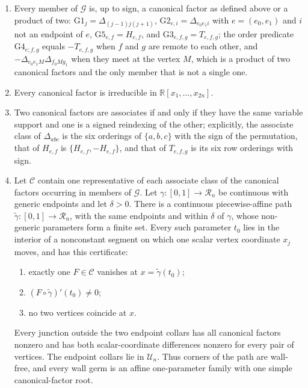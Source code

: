 \begin{lemma}
\begin{enumerate}
\item[(A1)] Every member of $\mathcal G$ is, up to sign, a canonical factor
as defined above or a product of two: $\mathrm{G1}_j=\Delta_{(j-1)j(j+1)}$,
$\mathrm{G2}_{e,i}=\Delta_{e_0e_1i}$ with $e=(e_0,e_1)$ and $i$ not an endpoint
of $e$, $\mathrm{G5}_{e,f}=H_{e,f}$, and $\mathrm{G3}_{e,f,g}=T_{e,f,g}$; the
order predicate $\mathrm{G4}_{e;f,g}$ equals $-T_{e,f,g}$ when $f$ and $g$ are
remote to each other, and $-\Delta_{e_0e_1M}\Delta_{f_0Mg_1}$ when they meet at
the vertex $M$, which is a product of two canonical factors and the only
member that is not a single one.
\item[(A2)] Every canonical factor is irreducible in $\mathbb R[x_1,\dots,x_{2n}]$.
\item[(A3)] Two canonical factors are associates if and only if they have the same
variable support and one is a signed reindexing of the other; explicitly, the
associate class of $\Delta_{abc}$ is the six orderings of $\{a,b,c\}$ with the
sign of the permutation, that of $H_{e,f}$ is $\{H_{e,f},-H_{e,f}\}$, and that
of $T_{e,f,g}$ is its six row orderings with sign.
\item[(B)] Let $\mathcal C$ contain one representative of each associate class of the
canonical factors occurring in members of $\mathcal G$. Let
$\gamma\colon[0,1]\to\mathcal R_n$ be continuous with generic endpoints and
let $\delta>0$. There is a continuous piecewise-affine path
$\tilde\gamma\colon[0,1]\to\mathcal R_n$, with the same endpoints and within
$\delta$ of $\gamma$, whose non-generic parameters form a finite set. Every
such parameter $t_0$ lies in the interior of a nonconstant segment on which one
scalar vertex coordinate $x_j$ moves, and has this certificate:
\begin{enumerate}
\item[(B1)] exactly one $F\in\mathcal C$ vanishes at
$x=\tilde\gamma(t_0)$;
\item[(B2)] $(F\circ\tilde\gamma)'(t_0)\neq0$;
\item[(B3)] no two vertices coincide at $x$.
\end{enumerate}
Every junction outside the two endpoint collars has all canonical factors
nonzero and has both scalar-coordinate differences nonzero for every pair of
vertices. The endpoint collars lie in $\mathcal U_n$. Thus corners of the path
are wall-free, and every wall germ is an affine one-parameter family with one
simple canonical-factor root.
\end{enumerate}
\end{lemma}
